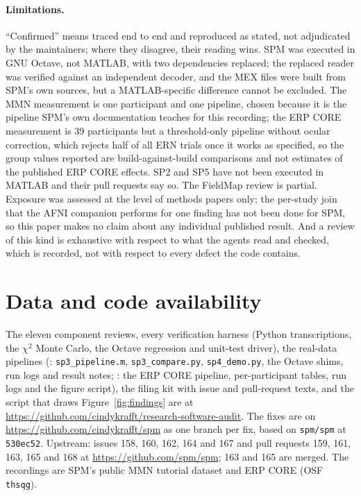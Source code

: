 \documentclass[11pt]{article}
\newcommand{\code}[1]{\texttt{#1}}
\begin{document}
\paragraph{Limitations.} ``Confirmed'' means traced end to end and reproduced as stated, not adjudicated by the maintainers; where they disagree, their reading wins. SPM was executed in GNU Octave, not MATLAB, with two dependencies replaced; the replaced reader was verified against an independent decoder, and the MEX files were built from SPM's own sources, but a MATLAB-specific difference cannot be excluded. The MMN measurement is one participant and one pipeline, chosen because it is the pipeline SPM's own documentation teaches for this recording; the ERP CORE measurement is 39 participants but a threshold-only pipeline without ocular correction, which rejects half of all ERN trials once it works as specified, so the group values reported are build-against-build comparisons and not estimates of the published ERP CORE effects. SP2 and SP5 have not been executed in MATLAB and their pull requests say so. The FieldMap review is partial. Exposure was assessed at the level of methods papers only; the per-study join that the AFNI companion performs for one finding has not been done for SPM, so this paper makes no claim about any individual published result. And a review of this kind is exhaustive with respect to what the agents read and checked, which is recorded, not with respect to every defect the code contains.

\section*{Data and code availability}
The eleven component reviews, every verification harness (Python transcriptions, the $\chi^2$ Monte Carlo, the Octave regression and unit-test driver), the real-data pipelines (: \code{sp3\_pipeline.m}, \code{sp3\_compare.py}, \code{sp4\_demo.py}, the Octave shims, run logs and result notes; : the ERP CORE pipeline, per-participant tables, run logs and the figure script), the filing kit with issue and pull-request texts, and the script that draws Figure~\ref{fig:findings} are at \url{https://github.com/cindykrafft/research-software-audit}. The fixes are on \url{https://github.com/cindykrafft/spm} as one branch per fix, based on \code{spm/spm} at \code{530ec52}. Upstream: issues 158, 160, 162, 164 and 167 and pull requests 159, 161, 163, 165 and 168 at \url{https://github.com/spm/spm}; 163 and 165 are merged. The recordings are SPM's public MMN tutorial dataset and ERP CORE (OSF \code{thsqg}).
\end{document}
